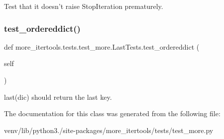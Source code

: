 \begin{DoxyVerb}Test that it doesn't raise StopIteration prematurely.\end{DoxyVerb}
 \mbox{\label{classmore__itertools_1_1tests_1_1test__more_1_1_last_tests_aedc2c18a8a54233f5a45e6e6942dde5d}} 
\subsubsection{\texorpdfstring{test\+\_\+ordereddict()}{test\_ordereddict()}}
{\footnotesize\ttfamily def more\+\_\+itertools.\+tests.\+test\+\_\+more.\+Last\+Tests.\+test\+\_\+ordereddict (\begin{DoxyParamCaption}\item[{}]{self }\end{DoxyParamCaption})}

\begin{DoxyVerb}last(dic) should return the last key.\end{DoxyVerb}
 

The documentation for this class was generated from the following file\+:\begin{DoxyCompactItemize}
\item 
venv/lib/python3./site-\/packages/more\+\_\+itertools/tests/test\+\_\+more.\+py\end{DoxyCompactItemize}
